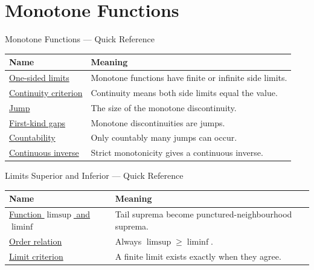
\section{Monotone Functions}

\begin{toolkitbox}{Monotone Functions --- Quick Reference}
\small
\begin{tabular}{l l}
\toprule
\textbf{Name} & \textbf{Meaning}\\
\midrule
\hyperref[thm:monotone-one-sided-limits]{One-sided limits} & Monotone functions have finite or infinite side limits.\\
\hyperref[cor:monotone-continuity-criterion]{Continuity criterion} & Continuity means both side limits equal the value.\\
\hyperref[def:jump-of-function]{Jump} & The size of the monotone discontinuity.\\
\hyperref[prop:monotone-discontinuities-first-kind]{First-kind gaps} & Monotone discontinuities are jumps.\\
\hyperref[thm:monotone-discontinuities-countable]{Countability} & Only countably many jumps can occur.\\
\hyperref[thm:continuous-inverse-theorem]{Continuous inverse} & Strict monotonicity gives a continuous inverse.\\
\bottomrule
\end{tabular}
\end{toolkitbox}


\begin{toolkitbox}{Limits Superior and Inferior --- Quick Reference}
\small
\begin{tabular}{l l}
\toprule
\textbf{Name} & \textbf{Meaning}\\
\midrule
\hyperref[def:limsup-liminf-function]{Function $\limsup$ and $\liminf$} & Tail suprema become punctured-neighbourhood suprema.\\
\hyperref[prop:limsup-geq-liminf-function]{Order relation} & Always $\limsup \geq \liminf$.\\
\hyperref[prop:limsup-liminf-limit-criterion]{Limit criterion} & A finite limit exists exactly when they agree.\\
\bottomrule
\end{tabular}
\end{toolkitbox}




